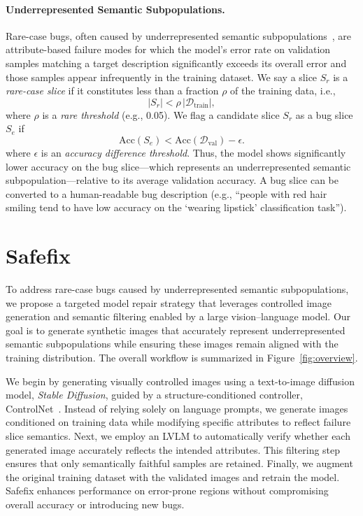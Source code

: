 \documentclass[10pt]{article} %
\newcommand{\model}{Safefix\xspace}
\newcommand{\controlnet}{ControlNet\xspace}
\begin{document}
\paragraph{Underrepresented Semantic Subpopulations.} Rare-case bugs, often caused by underrepresented semantic subpopulations~\citep{eyuboglu2022rare}, are attribute-based failure modes for which the model’s error rate on validation samples matching a target description significantly exceeds its overall error and those samples appear infrequently in the training dataset. We say a slice \(S_r\) is a \emph{rare-case slice} if it constitutes less than a fraction \(\rho\) of the training data, i.e., 
\begin{equation}
|S_r| < \rho \,\bigl|\mathcal{D}_{\mathrm{train}}\bigr|,
\label{eq:rare}
\end{equation}
where \(\rho\) is a \emph{rare threshold} (e.g., 0.05). We flag a candidate slice \(S_r\) as a bug slice \(S_e\) if  
\begin{equation}
\mathrm{Acc}(S_{e}) < \mathrm{Acc}(\mathcal{D}_{\mathrm{val}}) - \epsilon.
\label{eq:low_acc_and_rare}
\end{equation}
where \(\epsilon\) is an \emph{accuracy difference threshold}. Thus, the model shows significantly lower accuracy on the bug slice—which represents an underrepresented semantic subpopulation—relative to its average validation accuracy. A bug slice can be converted to a human-readable bug description (e.g., “people with red hair smiling tend to have low accuracy on the ‘wearing lipstick’ classification task”).





\section{\model}
To address rare-case bugs caused by underrepresented semantic subpopulations, we propose a targeted model repair strategy that leverages controlled image generation and semantic filtering enabled by a large vision--language model. Our goal is to generate synthetic images that accurately represent underrepresented semantic subpopulations while ensuring these images remain aligned with the training distribution. The overall workflow is summarized in Figure~\ref{fig:overview}.

We begin by generating visually controlled images using a text-to-image diffusion model, \textit{Stable Diffusion}, guided by a structure-conditioned controller, \controlnet{}~\citep{zhang2023adding}. Instead of relying solely on language prompts, we generate images conditioned on training data while modifying specific attributes to reflect failure slice semantics. Next, we employ an LVLM to automatically verify whether each generated image accurately reflects the intended attributes. This filtering step ensures that only semantically faithful samples are retained. Finally, we augment the original training dataset with the validated images and retrain the model. \model enhances performance on error-prone regions without compromising overall accuracy or introducing new bugs.
\end{document}
